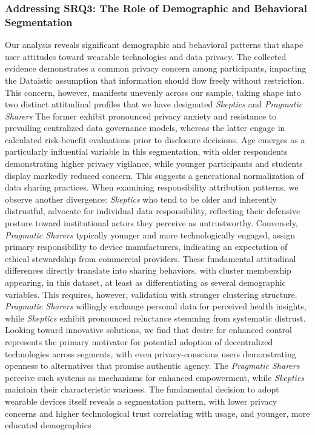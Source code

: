 	\subsubsection{Addressing SRQ3: The Role of Demographic and Behavioral Segmentation}
	Our analysis reveals significant demographic and behavioral patterns that shape user attitudes toward wearable technologies and data privacy. The collected evidence demonstrates a common privacy concern among participants, impacting the Dataistic assumption that information should flow freely without restriction. This concern, however, manifests unevenly across our sample, taking shape into two distinct attitudinal profiles that we have designated \textit{Skeptics} and \textit{Pragmatic Sharers} The former exhibit pronounced privacy anxiety and resistance to prevailing centralized data governance models, whereas the latter engage in calculated risk-benefit evaluations prior to disclosure decisions. Age emerges as a particularly influential variable in this segmentation, with older respondents demonstrating higher privacy vigilance, while younger participants and students display markedly reduced concern. This suggests a generational normalization of data sharing practices. When examining responsibility attribution patterns, we observe another divergence: \textit{Skeptics} who tend to be older and inherently distrustful, advocate for individual data responsibility, reflecting their defensive posture toward institutional actors they perceive as untrustworthy. Conversely, \textit{Pragmatic Sharers} typically younger and more technologically engaged, assign primary responsibility to device manufacturers, indicating an expectation of ethical stewardship from commercial providers. These fundamental attitudinal differences directly translate into sharing behaviors, with cluster membership appearing, in this dataset, at least as differentiating as several demographic variables. This requires, however, validation with stronger clustering structure. \textit{Pragmatic Sharers} willingly exchange personal data for perceived health insights, while \textit{Skeptics} exhibit pronounced reluctance stemming from systematic distrust. Looking toward innovative solutions, we find that desire for enhanced control represents the primary motivator for potential adoption of decentralized technologies across segments, with even privacy-conscious users demonstrating openness to alternatives that promise authentic agency. The \textit{Pragmatic Sharers} perceive such systems as mechanisms for enhanced empowerment, while \textit{Skeptics} maintain their characteristic wariness. The fundamental decision to adopt wearable devices itself reveals a segmentation pattern, with lower privacy concerns and higher technological trust correlating with usage, and younger, more educated demographics 
